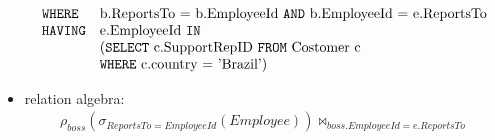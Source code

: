 \begin{exercise}{16}
\begin{subexercise}
\begin{itemize}
\begin{displaymath}
\begin{array}{l l}
                \text{\texttt{WHERE}}& \text{b.ReportsTo = b.EmployeeId
                                      \texttt{AND} b.EmployeeId = e.ReportsTo} \\
                \text{\texttt{HAVING}} & \text{e.EmployeeId \texttt{IN}} \\
                                    &(\text{\texttt{SELECT} c.SupportRepID \texttt{FROM} Costomer c} \\
                                    & \text{\texttt{WHERE} c.country = 'Brazil')}
              \end{array}
            \end{displaymath}
      \item relation algebra:
        \begin{displaymath}
          \begin{array}{l}
            \rho_{boss}(\sigma_{ReportsTo=EmployeeId}(Employee))
            \bowtie_{boss.EmployeeId=e.ReportsTo} \\


\end{array}
\end{displaymath}
\end{itemize}
\end{subexercise}
\end{exercise}
